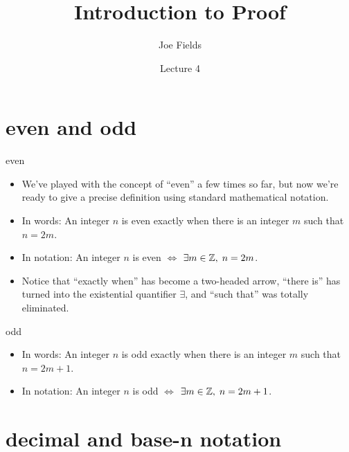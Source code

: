 \documentclass[landscape]{beamer}
\author{Joe Fields}
\title{Introduction to Proof}
\date{Lecture 4}
\institute[SCSU]{ {\tt fieldsj1@southernct.edu} }
\begin{document}
\begin{frame}[plain]
  \titlepage
\end{frame}


\section{even and odd}

\begin{frame}{even}
\begin{itemize}
\item We've played with the concept of ``even'' a few times so far, but now we're ready to give a precise definition using standard mathematical notation. \pause
\item \rule{0pt}{18pt} In words: \newline
An integer $n$ is even exactly when there is an integer $m$ such that $n = 2m$. \pause

\item \rule{0pt}{18pt} In notation: \newline
An integer $n$ is even \hspace{8pt} $\iff$ \hspace{8pt}  $\exists m \in {\mathbb Z}, \; n = 2m$. \pause

\item \rule{0pt}{18pt} Notice that ``exactly when'' has become a two-headed arrow, ``there is'' has turned into the existential quantifier $\exists$, and ``such that'' was totally eliminated.
\end{itemize}
\end{frame}

\begin{frame}{odd}
\begin{itemize}
\item \rule{0pt}{18pt} In words: \newline
An integer $n$ is odd exactly when there is an integer $m$ such that $n = 2m+1$. \pause

\item \rule{0pt}{18pt} In notation: \newline
An integer $n$ is odd \hspace{8pt} $\iff$ \hspace{8pt}  $\exists m \in {\mathbb Z}, \; n = 2m+1$. \pause

\end{itemize}
\end{frame}

\section{decimal and base-n notation}
\end{document}
